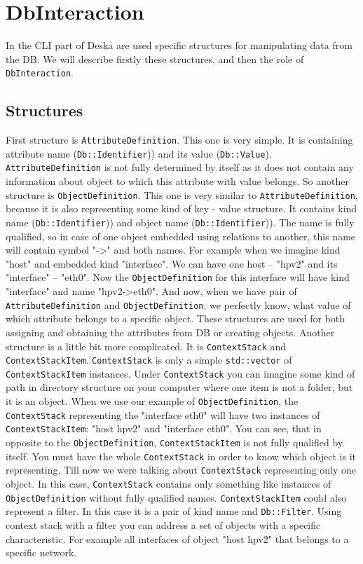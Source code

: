 \documentclass[deska]{subfiles}
\begin{document}
\section{DbInteraction}

In the CLI part of Deska are used specific structures for manipulating data from the DB. We will describe firstly 
these structures, and then the role of {\tt DbInteraction}.

\subsection{Structures}

First structure is {\tt AttributeDefinition}. This one is very simple. It is containing attribute name ({\tt Db::Identifier}))
and its value ({\tt Db::Value}). {\tt AttributeDefinition} is not fully determined by itself as it 
does not contain any information about object to which this attribute with value belongs. So another structure is {\tt ObjectDefinition}.
This one is very similar to {\tt AttributeDefinition}, because it is also representing some kind of 
key - value structure. It contains kind name ({\tt Db::Identifier})) and object name ({\tt Db::Identifier})). The name 
is fully qualified, so in case of one object embedded using relations to another, this name will contain symbol "->" 
and both names. For example when we imagine kind "host" and embedded kind "interface". We can have one host -- "hpv2" 
and its "interface" -- "eth0". Now the {\tt ObjectDefinition} for this interface will have kind "interface" and name 
"hpv2->eth0". And now, when we have pair of {\tt AttributeDefinition} and {\tt ObjectDefinition}, we perfectly know, 
what value of which attribute belongs to a specific object. These structures are used for both assigning and obtaining 
the attributes from DB or creating objects. Another structure is a little bit more complicated. It is {\tt ContextStack}
and {\tt ContextStackItem}. {\tt ContextStack} is only a simple {\tt std::vector} of {\tt ContextStackItem} instances.
Under {\tt ContextStack} you can imagine some kind of path in directory structure on your computer where one item is not
a folder, but it is an object. When we use our example of {\tt ObjectDefinition}, the {\tt ContextStack} representing
the "interface eth0" will have two instances of {\tt ContextStackItem}: "host hpv2" and "interface eth0". You can see,
that in opposite to the {\tt ObjectDefinition}, {\tt ContextStackItem} is not fully qualified by itself. You must have
the whole {\tt ContextStack} in order to know which object is it representing. Till now we were talking about
{\tt ContextStack} representing only one object. In this case, {\tt ContextStack} contains only something like
instances of {\tt ObjectDefinition} without fully qualified names. {\tt ContextStackItem} could also represent a filter.
In this case it is a pair of kind name and {\tt Db::Filter}. Using context stack with a filter you can address a set of
objects with a specific characteristic. For example all interfaces of object "host hpv2" that belongs to a specific
network.
\end{document}
